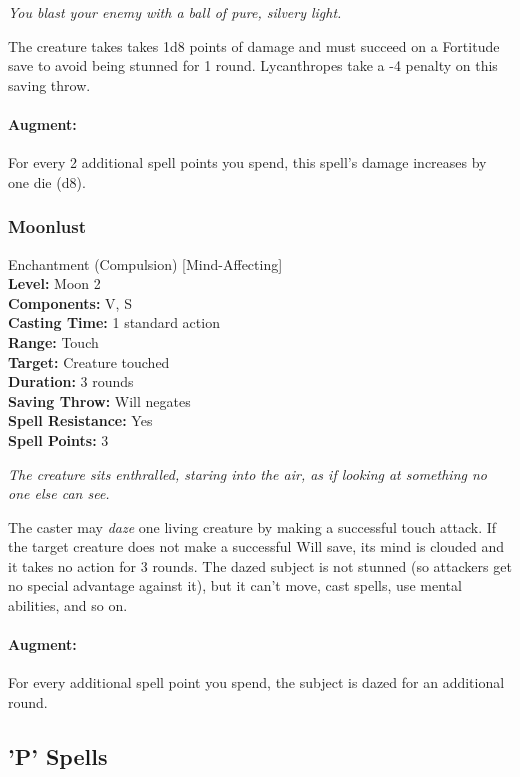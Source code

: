 \emph{You blast your enemy with a ball of pure, silvery light.}

The creature takes takes 1d8 points of damage and must succeed on a Fortitude save to avoid being stunned for 1 round. Lycanthropes take a -4 penalty on this saving throw.

\paragraph{Augment:} For every 2 additional spell points you spend, this spell's damage increases by one die (d8).
\subsubsection{Moonlust}
\label{Spell:Moonlust}
Enchantment (Compulsion) [Mind-Affecting]
\\ \textbf{Level:} Moon 2
\\ \textbf{Components:} V, S
\\ \textbf{Casting Time:} 1 standard action
\\ \textbf{Range:} Touch
\\ \textbf{Target:} Creature touched
\\ \textbf{Duration:} 3 rounds
\\ \textbf{Saving Throw:} Will negates
\\ \textbf{Spell Resistance:} Yes
\\ \textbf{Spell Points:} 3

\emph{The creature sits enthralled, staring into the air, as if looking at something no one else can see.}

The caster may \emph{daze} one living creature by making a successful touch attack. 
If the target creature does not make a successful Will save, its mind is clouded and it takes no action for 3 rounds. 
The dazed subject is not stunned (so attackers get no special advantage against it), but it can't move, cast spells, use mental abilities, and so on.

\paragraph{Augment:} For every additional spell point you spend, the subject is dazed for an additional round.

\subsection{'P' Spells}
